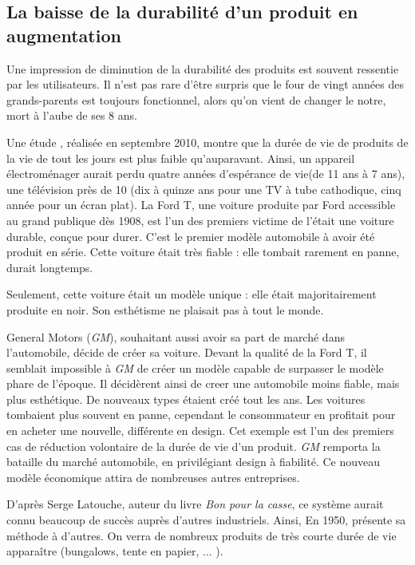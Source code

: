 \subsection{La baisse de la durabilité d'un produit en augmentation}

Une impression de diminution de la durabilité des produits est souvent ressentie par les utilisateurs.  Il n'est pas rare d'être surpris que le four de vingt années des grands-parents est toujours fonctionnel, alors qu'on vient de changer le notre, mort à l'aube de ses 8 ans. 

Une étude \cite{opSsg}, réalisée en septembre 2010, montre que la durée de vie de produits de la vie de tout les jours est plus faible qu'auparavant. Ainsi, un appareil électroménager aurait perdu quatre années d'espérance de vie(de 11 ans à 7 ans), une télévision près de 10 (dix à quinze ans pour une TV à tube cathodique, cinq année pour un écran plat). 
\smallbreak
La Ford T, une voiture produite par Ford accessible au grand publique dès 1908, est l'un des premiers victime de l'\op était une voiture durable, conçue pour durer.  C'est le premier modèle automobile à avoir été produit en série. Cette voiture était très fiable : elle tombait rarement en panne, durait longtemps. 

Seulement, cette voiture était un modèle unique : elle était majoritairement produite en noir. Son esthétisme ne plaisait pas à tout le monde. 

General Motors (\textit{GM}), souhaitant aussi avoir sa part de marché dans l'automobile, décide de créer sa voiture. Devant la qualité de la Ford T, il semblait impossible à \textit{GM} de créer un modèle capable de surpasser le modèle phare de l'époque. Il décidèrent ainsi de creer une automobile moins fiable, mais plus esthétique. De nouveaux types étaient créé tout les ans. Les voitures tombaient plus souvent en panne, cependant le consommateur en profitait pour en acheter une nouvelle, différente en design. 
\smallbreak
Cet exemple est l'un des premiers cas de réduction volontaire de la durée de vie d'un produit. \textit{GM} remporta la bataille du marché automobile, en privilégiant design à fiabilité. Ce nouveau modèle économique attira de nombreuses autres entreprises. 

D'après Serge Latouche, auteur du livre \textit{Bon pour la casse}\cite{bpc}, ce système aurait connu beaucoup de succès auprès d'autres industriels. Ainsi, En 1950, présente sa méthode à d'autres. On verra de nombreux produits de très courte durée de vie apparaître  (bungalows, tente en papier, ... ).






